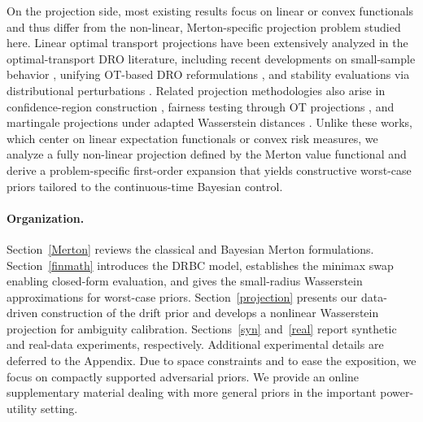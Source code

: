 \documentclass[11pt]{article}
\theoremstyle{definition}
\begin{document}
On the projection side, most existing results focus on linear or convex functionals and thus differ from the non-linear, Merton-specific projection problem studied here. Linear optimal transport projections have been extensively analyzed in the optimal-transport DRO literature, including recent developments on small-sample behavior \cite{LinBlanchetGlynnNguyen2024}, unifying OT-based DRO reformulations \cite{BlanchetKuhnLiTaskesen2023}, and stability evaluations via distributional perturbations \cite{BlanchetCuiLiLiu2024}. Related projection methodologies also arise in confidence-region construction \cite{BlanchetMurthySi2022}, fairness testing through OT projections \cite{SiMurthyBlanchetNguyen2021, TaskesenBlanchetKuhnNguyen2021}, and martingale projections under adapted Wasserstein distances \cite{BlanchetWieselZhangZhang2024}. Unlike these works, which center on linear expectation functionals or convex risk measures, we analyze a fully non-linear projection defined by the Merton value functional and derive a problem-specific first-order expansion that yields constructive worst-case priors tailored to the continuous-time Bayesian control.


\paragraph{Organization.} Section~\ref{Merton} reviews the classical and Bayesian Merton formulations. Section~\ref{finmath} introduces the DRBC model, establishes the minimax swap enabling closed-form evaluation, and gives the small-radius Wasserstein approximations for worst-case priors. Section~\ref{projection} presents our data-driven construction of the drift prior and develops a nonlinear Wasserstein projection for ambiguity calibration. Sections~\ref{syn} and~\ref{real} report synthetic and real-data experiments, respectively. Additional experimental details are deferred to the Appendix. Due to space constraints and to ease the exposition, we focus on compactly supported adversarial priors. We provide an online supplementary material dealing with more general priors in the important power-utility setting.
\end{document}
